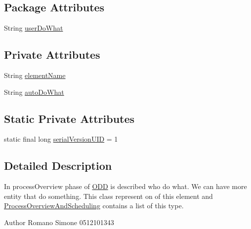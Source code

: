 \subsection*{Package Attributes}
\begin{DoxyCompactItemize}
\item 
String \hyperlink{classit_1_1isislab_1_1masonassisteddocumentation_1_1_o_d_d_1_1_process_overview_element_ab39c20998999736850ea082841f50d13}{user\-Do\-What}
\end{DoxyCompactItemize}
\subsection*{Private Attributes}
\begin{DoxyCompactItemize}
\item 
String \hyperlink{classit_1_1isislab_1_1masonassisteddocumentation_1_1_o_d_d_1_1_process_overview_element_ad44b2ab115c10d6ea8d4bbd4d2a23ac5}{element\-Name}
\item 
String \hyperlink{classit_1_1isislab_1_1masonassisteddocumentation_1_1_o_d_d_1_1_process_overview_element_a911b694816293e12e2821c2fc93653cf}{auto\-Do\-What}
\end{DoxyCompactItemize}
\subsection*{Static Private Attributes}
\begin{DoxyCompactItemize}
\item 
static final long \hyperlink{classit_1_1isislab_1_1masonassisteddocumentation_1_1_o_d_d_1_1_process_overview_element_a701ffecb0c1bf255ae7c1f0528eb6737}{serial\-Version\-U\-I\-D} = 1
\end{DoxyCompactItemize}


\subsection{Detailed Description}
In process\-Overview phase of \hyperlink{classit_1_1isislab_1_1masonassisteddocumentation_1_1_o_d_d_1_1_o_d_d}{O\-D\-D} is described who do what. We can have more entity that do something. This class represent on of this element and \hyperlink{classit_1_1isislab_1_1masonassisteddocumentation_1_1_o_d_d_1_1_process_overview_and_scheduling}{Process\-Overview\-And\-Scheduling} contains a list of this type. \begin{DoxyAuthor}{Author}
Romano Simone 0512101343 
\end{DoxyAuthor}


